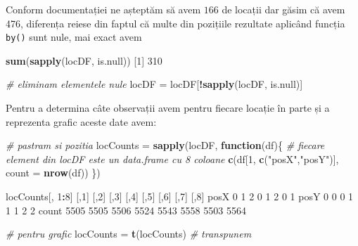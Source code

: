 \documentclass[]{article}
\newenvironment{Shaded}{\begin{snugshade}}{\end{snugshade}}
\newcommand{\KeywordTok}[1]{\textcolor[rgb]{0.13,0.29,0.53}{\textbf{#1}}}
\newcommand{\DataTypeTok}[1]{\textcolor[rgb]{0.13,0.29,0.53}{#1}}
\newcommand{\DecValTok}[1]{\textcolor[rgb]{0.00,0.00,0.81}{#1}}
\newcommand{\StringTok}[1]{\textcolor[rgb]{0.31,0.60,0.02}{#1}}
\newcommand{\CommentTok}[1]{\textcolor[rgb]{0.56,0.35,0.01}{\textit{#1}}}
\newcommand{\ControlFlowTok}[1]{\textcolor[rgb]{0.13,0.29,0.53}{\textbf{#1}}}
\newcommand{\OperatorTok}[1]{\textcolor[rgb]{0.81,0.36,0.00}{\textbf{#1}}}
\newcommand{\NormalTok}[1]{#1}
\begin{document}
Conform documentației ne așteptăm să avem \(166\) de locații dar găsim
că avem 476, diferența reiese din faptul că multe din pozițiile
rezultate aplicând funcția \texttt{by()} sunt nule, mai exact avem

\begin{Shaded}
\begin{Highlighting}[]
\KeywordTok{sum}\NormalTok{(}\KeywordTok{sapply}\NormalTok{(locDF, is.null))}
\NormalTok{[}\DecValTok{1}\NormalTok{] }\DecValTok{310}

\CommentTok{# eliminam elementele nule}
\NormalTok{locDF =}\StringTok{ }\NormalTok{locDF[}\OperatorTok{!}\KeywordTok{sapply}\NormalTok{(locDF, is.null)]}
\end{Highlighting}
\end{Shaded}

Pentru a determina câte observații avem pentru fiecare locație în parte
și a reprezenta grafic aceste date avem:

\begin{Shaded}
\begin{Highlighting}[]
\CommentTok{# pastram si pozitia}
\NormalTok{locCounts =}\StringTok{ }\KeywordTok{sapply}\NormalTok{(locDF, }\ControlFlowTok{function}\NormalTok{(df)\{}
  \CommentTok{# fiecare element din locDF este un data.frame cu 8 coloane }
  \KeywordTok{c}\NormalTok{(df[}\DecValTok{1}\NormalTok{, }\KeywordTok{c}\NormalTok{(}\StringTok{"posX"}\NormalTok{,}\StringTok{"posY"}\NormalTok{)], }\DataTypeTok{count =} \KeywordTok{nrow}\NormalTok{(df))}
\NormalTok{\})}

\NormalTok{locCounts[, }\DecValTok{1}\OperatorTok{:}\DecValTok{8}\NormalTok{]}
\NormalTok{      [,}\DecValTok{1}\NormalTok{] [,}\DecValTok{2}\NormalTok{] [,}\DecValTok{3}\NormalTok{] [,}\DecValTok{4}\NormalTok{] [,}\DecValTok{5}\NormalTok{] [,}\DecValTok{6}\NormalTok{] [,}\DecValTok{7}\NormalTok{] [,}\DecValTok{8}\NormalTok{]}
\NormalTok{posX  }\DecValTok{0}    \DecValTok{1}    \DecValTok{2}    \DecValTok{0}    \DecValTok{1}    \DecValTok{2}    \DecValTok{0}    \DecValTok{1}   
\NormalTok{posY  }\DecValTok{0}    \DecValTok{0}    \DecValTok{0}    \DecValTok{1}    \DecValTok{1}    \DecValTok{1}    \DecValTok{2}    \DecValTok{2}   
\NormalTok{count }\DecValTok{5505} \DecValTok{5505} \DecValTok{5506} \DecValTok{5524} \DecValTok{5543} \DecValTok{5558} \DecValTok{5503} \DecValTok{5564}

\CommentTok{# pentru grafic }
\NormalTok{locCounts =}\StringTok{ }\KeywordTok{t}\NormalTok{(locCounts) }\CommentTok{# transpunem }
\end{Highlighting}
\end{Shaded}
\end{document}
